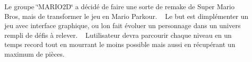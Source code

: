 Le groupe \char`\"{}\+MARIO2\+D\char`\"{} a décidé de faire une sorte de remake de Super Mario Bros, mais de transformer le jeu en Mario Parkour. ~\newline
Le but est d\textquotesingle{}implémenter un jeu avec interface graphique, ou l\textquotesingle{}on fait évoluer un personnage dans un univers rempli de défis à relever. ~\newline
L\textquotesingle{}utilisateur devra parcourir chaque niveau en un temps record tout en mourrant le moins possible mais aussi en récupérant un maximum de pièces. 